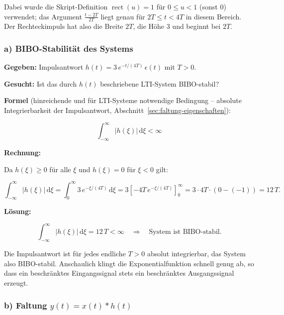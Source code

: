 Dabei wurde die Skript-Definition
$\operatorname{rect}(u) = 1$ für $0 \leq u < 1$ (sonst $0$) verwendet; das
Argument $\tfrac{t-2T}{2T}$ liegt genau für $2T \leq t < 4T$ in diesem Bereich.
Der Rechteckimpuls hat also die Breite $2T$, die Höhe $3$ und beginnt bei $2T$.

\subsubsection*{a) BIBO-Stabilität des Systems}

\begin{beispiel}

\textbf{Gegeben:} Impulsantwort $h(t) = 3\, e^{-t/(4T)}\, \epsilon(t)$ mit
$T > 0$.

\textbf{Gesucht:} Ist das durch $h(t)$ beschriebene LTI-System BIBO-stabil?

\textbf{Formel} (hinreichende und für LTI-Systeme notwendige Bedingung --
absolute Integrierbarkeit der Impulsantwort,
Abschnitt~\ref{sec:faltung-eigenschaften}):

$$
\int_{-\infty}^{\infty} |h(\xi)|\,\mathrm{d}\xi < \infty
$$

\textbf{Rechnung:}

Da $h(\xi) \geq 0$ für alle $\xi$ und $h(\xi) = 0$ für $\xi < 0$ gilt:

$$
\int_{-\infty}^{\infty} |h(\xi)|\,\mathrm{d}\xi
= \int_0^{\infty} 3\, e^{-\xi/(4T)}\,\mathrm{d}\xi
= 3\left[-4T\, e^{-\xi/(4T)}\right]_0^{\infty}
= 3 \cdot 4T \cdot (0 - (-1)) = 12\,T.
$$

\textbf{Lösung:}

$$
\boxed{\;\int_{-\infty}^{\infty} |h(\xi)|\,\mathrm{d}\xi = 12\,T < \infty
\quad\Longrightarrow\quad \text{System ist BIBO-stabil.}\;}
$$

Die Impulsantwort ist für jedes endliche $T > 0$ absolut integrierbar, das
System also BIBO-stabil. Anschaulich klingt die Exponentialfunktion schnell
genug ab, so dass ein beschränktes Eingangssignal stets ein beschränktes
Ausgangssignal erzeugt.

\end{beispiel}

\subsubsection*{b) Faltung $y(t) = x(t) * h(t)$}

